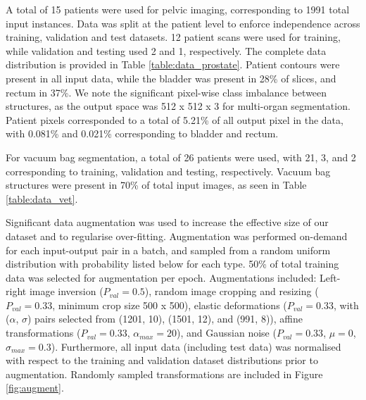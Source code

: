 A total of 15 patients were used for pelvic imaging, corresponding to 1991 total input instances. Data was split at the patient level to enforce independence across training, validation and test datasets. 12 patient scans were used for training, while validation and testing used 2 and 1, respectively. The complete data distribution is provided in Table \ref{table:data_prostate}. Patient contours were present in all input data, while the bladder was present in 28\% of slices, and rectum in 37\%. We note the significant pixel-wise class imbalance between structures, as the output space was 512 x 512 x 3 for multi-organ segmentation. Patient pixels corresponded to a total of 5.21\% of all output pixel in the data, with 0.081\% and 0.021\% corresponding to bladder and rectum.



For vacuum bag segmentation, a total of 26 patients were used, with 21, 3, and 2 corresponding to training, validation and testing, respectively. Vacuum bag structures were present in 70\% of total input images, as seen in Table \ref{table:data_vet}.




Significant data augmentation was used to increase the effective size of our dataset and to regularise over-fitting. Augmentation was performed on-demand for each input-output pair in a batch, and sampled from a random uniform distribution with probability listed below for each type. 50\% of total training data was selected for augmentation per epoch. Augmentations included: Left-right image inversion ($P_{val}=0.5$), random image cropping and resizing ($P_{val}=0.33$, minimum crop size 500 x 500), elastic deformations ($P_{val}=0.33$, with ($\alpha$, $\sigma$) pairs selected from (1201, 10), (1501, 12), and (991, 8)), affine transformations ($P_{val}=0.33$, $\alpha_{max}=20$), and Gaussian noise ($P_{val}=0.33$, $\mu=0$, $\sigma_{max}=0.3$). Furthermore, all input data (including test data) was normalised with respect to the training and validation dataset distributions prior to augmentation. Randomly sampled transformations are included in Figure \ref{fig:augment}.

